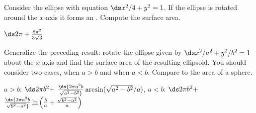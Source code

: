 \begin{enumialphparenastyle}
\begin{ex}
 Consider the ellipse with equation $\ds x^2/4+y^2 = 1$.
If the ellipse is rotated around the $x$-axis it forms 
an .
Compute the surface area.
\begin{sol}
 $\ds 2\pi+{8\pi^2\over 3\sqrt{3}}$
\end{sol}
\end{ex}

\begin{ex}
 Generalize the preceding result: rotate the ellipse
given by $\ds x^2/a^2+y^2/b^2=1$ about the
$x$-axis and find the surface area of the resulting ellipsoid. You
should consider two cases, when $a>b$ and when $a<b$. Compare to the
area of a sphere.
\begin{sol}
 $a>b$: $\ds 2\pi b^2+$\hfill\break
\hbox{\hskip1cm}$\ds {2\pi a^2b\over\sqrt{a^2-b^2}}
  \arcsin(\sqrt{a^2-b^2}/a)$,\hfill\break
$a<b$: $\ds 2\pi b^2+ $\hfill\break
\hbox{\hskip1cm}$\ds {2\pi a^2b\over\sqrt{b^2-a^2}}
  \ln\left({b\over a}+{\sqrt{b^2-a^2}\over a}\right)$
\end{sol}
\end{ex}

\end{enumialphparenastyle}